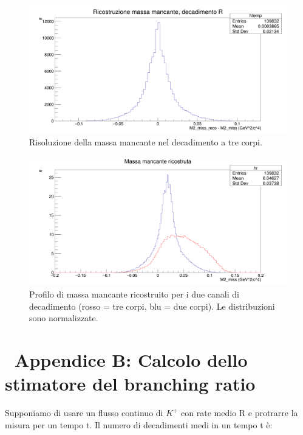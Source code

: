 \documentclass[8pt]{extarticle}
\begin{document}
\begin{figure}[!h]
\begin{center}
\includegraphics[scale=0.25]{reco_miss_R}
\caption{Risoluzione della massa mancante nel decadimento a tre corpi.}
\label{fig:reco_miss_R}
\end{center}
\end{figure}

\clearpage

\begin{figure}[!h]
\begin{center}
\includegraphics[scale=0.25]{reco_miss_norm}
\caption{Profilo di massa mancante ricostruito per i due canali di decadimento (rosso = tre corpi, blu = due corpi). Le distribuzioni
sono normalizzate.}
\label{fig:reco_miss_norm}
\end{center}
\end{figure}

\section{\ Appendice B: Calcolo dello stimatore del branching ratio} \label{sec:calcoli}
\justify

Supponiamo di usare un flusso continuo di $K^+$ con rate medio R e protrarre la misura per un tempo t. Il numero di decadimenti medi in un tempo t è: 
\end{document}
